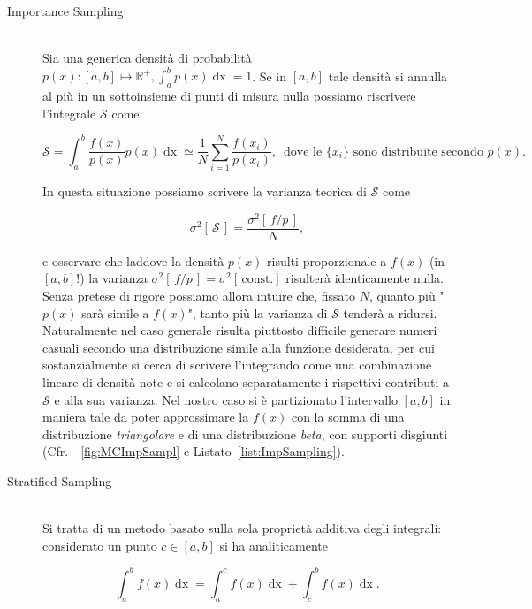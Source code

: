 \begin{description}
	
	\item[\quad\quad\! Importance Sampling]\quad\\
	Sia una generica densità di probabilità $p(x)\!: [a,b]\mapsto\mathbb{R}^+,\int_{a}^{b}p(x)\mathop{dx} = 1$. Se in $[a,b]$ tale densità si annulla al più in un sottoinsieme di punti di misura nulla possiamo riscrivere l'integrale $\mathcal{S}$ come:
	
	\begin{equation*}
	\mathcal{S} = \int_{a}^{b} \frac{f(x)}{p(x)}p(x)\mathop{dx} \simeq \frac{1}{N}\sum_{i=1}^{N}\frac{f(x_i)}{p(x_i)},\enspace \text{dove le } \{x_i\} \text{ sono distribuite secondo } p(x).
	\end{equation*}
	
	In questa situazione possiamo scrivere la varianza teorica di $\mathcal{S}$ come
	
	\begin{equation}
	\sigma^2[\,\mathcal{S}\,] = \frac{\sigma^2[\,f/p\,]}{N},
	\label{eq:ImportanceSampling}
	\end{equation}
	
	e osservare che laddove la densità $p(x)$ risulti proporzionale a $f(x)$ (in $[a,b]$!) la varianza $\sigma^2[\,f/p\,] = \sigma^2[\,\text{const.}]$ risulterà identicamente nulla. Senza pretese di rigore possiamo allora intuire che, fissato $N$, quanto più "$p(x)$ sarà simile a $f(x)$", tanto più la varianza di $\mathcal{S}$ tenderà a ridursi.\\
	Naturalmente nel caso generale risulta piuttosto difficile generare numeri casuali secondo una distribuzione simile alla funzione desiderata, per cui sostanzialmente si cerca di scrivere l'integrando come una combinazione lineare di densità note e si calcolano separatamente i rispettivi contributi a $\mathcal{S}$ e alla sua varianza. Nel nostro caso si è partizionato l'intervallo $[a,b]$ in maniera tale da poter approssimare la $f(x)$ con la somma di una distribuzione \emph{triangolare} e di una distribuzione \emph{beta}, con supporti disgiunti (Cfr.~\figurename~\ref{fig:MCImpSampl} e Listato~\ref{list:ImpSampling}).
		
	\item[\quad\quad\! Stratified Sampling]\quad\\
	Si tratta di un metodo basato sulla sola proprietà additiva degli integrali: considerato un punto $c\in[a,b]$ si ha analiticamente
	
	\begin{equation*}
	\int_{a}^{b} f(x)\mathop{dx} = \int_{a}^{c} f(x)\mathop{dx} + \int_{c}^{b} f(x)\mathop{dx}.
	\end{equation*}
	

\end{description}
